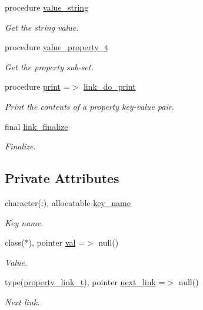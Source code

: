 \begin{DoxyCompactItemize}
procedure \mbox{\hyperlink{structpmc__property_1_1property__link__t_a5dd8fcdc7cbb8b1acf6b214e5d041bbd}{value\+\_\+string}}
\begin{DoxyCompactList}\small\item\em Get the string value. \end{DoxyCompactList}\item 
procedure \mbox{\hyperlink{structpmc__property_1_1property__link__t_ad34a62f46ff3daa591185c07e8c84938}{value\+\_\+property\+\_\+t}}
\begin{DoxyCompactList}\small\item\em Get the property sub-\/set. \end{DoxyCompactList}\item 
procedure \mbox{\hyperlink{structpmc__property_1_1property__link__t_add3f9442af45f91b2d5fe7e8a930df85}{print}} =$>$ \mbox{\hyperlink{namespacepmc__property_a4a9f323c08b7fe0a6855eade5aadf018}{link\+\_\+do\+\_\+print}}
\begin{DoxyCompactList}\small\item\em Print the contents of a property key-\/value pair. \end{DoxyCompactList}\item 
final \mbox{\hyperlink{structpmc__property_1_1property__link__t_a7bb9bb28acf068411faf76abddac6823}{link\+\_\+finalize}}
\begin{DoxyCompactList}\small\item\em Finalize. \end{DoxyCompactList}\end{DoxyCompactItemize}
\subsection*{Private Attributes}
\begin{DoxyCompactItemize}
\item 
character(\+:), allocatable \mbox{\hyperlink{structpmc__property_1_1property__link__t_a8f95fd4e2cc619c3c4aa9b47ac8883bf}{key\+\_\+name}}
\begin{DoxyCompactList}\small\item\em Key name. \end{DoxyCompactList}\item 
class($\ast$), pointer \mbox{\hyperlink{structpmc__property_1_1property__link__t_aaed71cc4fa453bdd77972e6472c06d77}{val}} =$>$ null()
\begin{DoxyCompactList}\small\item\em Value. \end{DoxyCompactList}\item 
type(\mbox{\hyperlink{structpmc__property_1_1property__link__t}{property\+\_\+link\+\_\+t}}), pointer \mbox{\hyperlink{structpmc__property_1_1property__link__t_a98c97c2d921ef44064c03ce3af5ab655}{next\+\_\+link}} =$>$ null()
\begin{DoxyCompactList}\small\item\em Next link. \end{DoxyCompactList}\end{DoxyCompactItemize}


